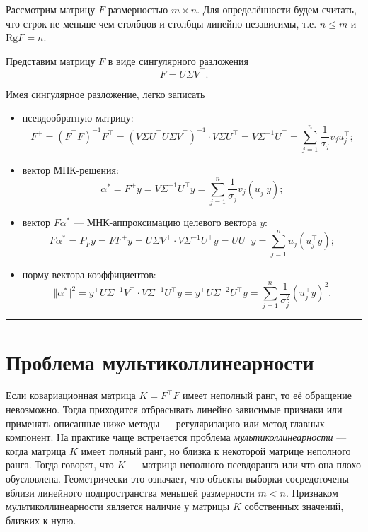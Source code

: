 \documentclass[11pt,a4paper]{article}
\begin{document}
Рассмотрим матрицу \(F\) размерностью \(m \times n\). Для определённости
будем считать, что строк не меньше чем столбцов и столбцы линейно
независимы, т.е. \(n \le m\) и \(\mathrm{Rg}F = n\).

Представим матрицу \(F\) в виде сингулярного разложения
\[ F = U \Sigma V^\top. \]

Имея сингулярное разложение, легко записать

\begin{itemize}
\item
  псевдообратную матрицу:
  \[ F^{+} = (F^\top F)^{-1}F^\top = (V \Sigma U^\top U \Sigma V^\top)^{-1} \cdot V \Sigma U^\top = V \Sigma^{-1}U^\top = \sum_{j=1}^n \frac{1}{{\sigma_j} }v_j u_j^\top;  \label{eq:psevdo}\tag{1} \]
\item
  вектор МНК-решения:
  \[ \alpha^* = F^{+} y  = V \Sigma^{-1}U^\top y = \sum_{j=1}^n \frac{1}{{\sigma_j}}v_j (u_j^\top y);  \label{eq:alpha-res}\tag{2} \]
\item
  вектор \(F\alpha^*\) --- МНК-аппроксимацию целевого вектора \(y\):
  \[ F\alpha^* = P_F y = FF^{+}y = U \Sigma V^\top \cdot V \Sigma^{-1}U^\top y = UU^\top y = \sum_{j=1}^n u_j (u_j^\top y);  \label{eq:F-alpha-res}\tag{3} \]
\item
  норму вектора коэффициентов:
  \[ \Vert \alpha^* \Vert^2 = y^\top U \Sigma^{-1}V^\top \cdot V \Sigma^{-1}U^\top y = y^\top U \Sigma^{-2}U^\top y = \sum_{j=1}^n \frac{1}{\sigma_j^2} (u_j^\top y)^2.  \label{eq:alpha-res-norm}\tag{4} \]
\end{itemize}

    \begin{center}\rule{0.5\linewidth}{0.5pt}\end{center}

    \hypertarget{ux43fux440ux43eux431ux43bux435ux43cux430-ux43cux443ux43bux44cux442ux438ux43aux43eux43bux43bux438ux43dux435ux430ux440ux43dux43eux441ux442ux438}{%
\section{Проблема
мультиколлинеарности}\label{ux43fux440ux43eux431ux43bux435ux43cux430-ux43cux443ux43bux44cux442ux438ux43aux43eux43bux43bux438ux43dux435ux430ux440ux43dux43eux441ux442ux438}}

Если ковариационная матрица \(K = F^\top F\) имеет неполный ранг, то её
обращение невозможно.
Тогда приходится отбрасывать линейно зависимые
признаки или применять описанные ниже методы --- регуляризацию или метод
главных компонент.
На практике чаще встречается проблема
\emph{мультиколлинеарности} --- когда матрица \(K\) имеет полный ранг,
но близка к некоторой матрице неполного ранга.
Тогда говорят, что \(K\)
--- матрица неполного псевдоранга или что она плохо обусловлена.
Геометрически это означает, что объекты выборки сосредоточены вблизи
линейного подпространства меньшей размерности \(m < n\). Признаком
мультиколлинеарности является наличие у матрицы \(K\) собственных
значений, близких к нулю.
\end{document}
